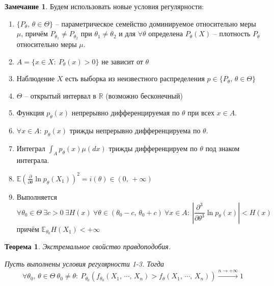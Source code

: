 \documentclass[a4paper,12pt]{article}
\theoremstyle{plain}
\newtheorem{theorem}{Теорема}[section]
\theoremstyle{definition}
\newtheorem*{note}{Замечание}
\theoremstyle{remark}
\begin{document}
\begin{note}
  Будем использовать новые условия регулярности:
  \begin{enumerate}
    \item $\{P_\theta,\, \theta \in \Theta\}$ -- параметрическое семейство доминируемое относительно меры $\mu$, причём $P_{\theta_1} \neq P_{\theta_2}$ при $\theta_1 \neq \theta_2$ и для $\forall \theta$ определена $P_\theta(X)$ -- плотность $P_\theta$ относительно меры $\mu$.
    \item $A = \{x \in X :\: P_\theta(x) > 0\}$ не зависит от $\theta$
    \item Наблюдение $X$ есть выборка из неизвестного распределения $p \in \{P_\theta,\, \theta \in \Theta\}$
    \item $\Theta$ -- открытый интервал в $\mathbb{R}$ (возможно бесконечный)
    \item Функция $p_\theta(x)$ непрерывно дифференцируемая по $\theta$ при всех $x \in A$.
    \item $\forall x \in A :\: p_\theta(x)$ трижды непрерывно дифференцируема по $\theta$.
    \item Интеграл $\int_Ap_\theta(x)\mu(dx)$ трижды дифференцируем по $\theta$ под знаком интеграла.
    \item $\mathbb{E}(\frac{\partial}{\partial\theta}\ln p_\theta(X_1))^2 = i(\theta) \in (0,\,+\infty)$
    \item Выполняется
    \[
      \forall  \theta_0 \in \Theta \: \exists c > 0 \: \exists H(x) \: \forall \theta \in (\theta_0 - c,\, \theta_0 + c) \: \forall x \in A :\: \left\vert\frac{\partial^3}{\partial\theta^3}\ln p_\theta(x)\right\vert < H(x)
    \]
    причём $\mathbb{E}_{\theta_0}H(X_1) < +\infty$
  \end{enumerate}
\end{note}

\begin{theorem}
  Экстремальное свойство правдоподобия.
  
  Пусть выполнены условия регулярности 1-3. Тогда
  \[
    \forall \theta_0,\,\theta \in \Theta \: \theta_0 \neq \theta :\: P_{\theta_0}(f_{\theta_0}(X_1,\,\cdots,\,X_n) > f_\theta(X_1,\,\cdots,\,X_n)) \overset{n \to +\infty}{\to} 1
  \]
\end{theorem}
\end{document}

